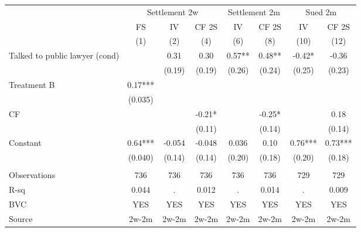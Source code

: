 \begin{tabular}{lccccccc}
\cmidrule{2-8}\multicolumn{1}{r|}{} & \multicolumn{3}{c|}{Settlement 2w} & \multicolumn{2}{c|}{Settlement 2m} & \multicolumn{2}{c|}{Sued 2m} \\
      & FS    & IV    & CF 2S & IV    & CF 2S & IV    & CF 2S \\
\midrule
\midrule
      & (1)   & (2)   & (4)   & (6)   & (8)   & (10)  & (12) \\
\midrule
\midrule
Talked to public lawyer (cond) &       & 0.31  & 0.30  & 0.57** & 0.48** & -0.42* & -0.36 \\
      &       & (0.19) & (0.19) & (0.26) & (0.24) & (0.25) & (0.23) \\
Treatment B & 0.17*** &       &       &       &       &       &  \\
      & (0.035) &       &       &       &       &       &  \\
CF    &       &       & -0.21* &       & -0.25* &       & 0.18 \\
      &       &       & (0.11) &       & (0.14) &       & (0.14) \\
Constant  & 0.64*** & -0.054 & -0.048 & 0.036 & 0.10  & 0.76*** & 0.73*** \\
      & (0.040) & (0.14) & (0.14) & (0.20) & (0.18) & (0.20) & (0.18) \\
      &       &       &       &       &       &       &  \\
\midrule
Observations & 736   & 736   & 736   & 736   & 736   & 729   & 729 \\
R-sq  & 0.044 & .     & 0.012 & .     & 0.014 & .     & 0.009 \\
BVC   & YES   & YES   & YES   & YES   & YES   & YES   & YES \\
Source & 2w-2m & 2w-2m & 2w-2m & 2w-2m & 2w-2m & 2w-2m & 2w-2m \\
\bottomrule
\bottomrule
\end{tabular}%
